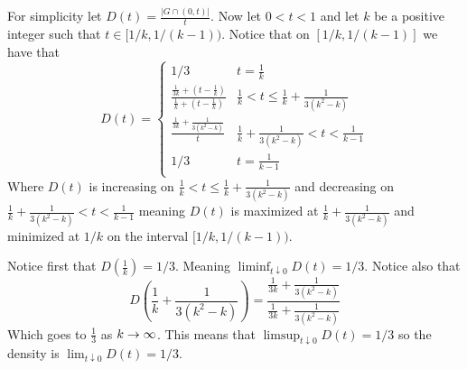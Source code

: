 \documentclass[12pt]{amsart}
\begin{document}
\begin{itemize}
   For simplicity let $D(t)=\frac{|G\cap (0,t)|}{t}$. 
   Now let $0<t<1$ and let $k$ be a positive integer such that $t\in[1/k,1/(k-1))$.
   Notice that on $[1/k,1/(k-1)]$ we have that
   \[D(t)=\begin{cases}
      1/3 & t=\frac{1}{k}\\
      \displaystyle{\frac{\frac{1}{3k}+(t-\frac{1}{k})}{\frac{1}{k}+(t-\frac{1}{k})}} & \frac{1}{k}<t\leq\frac{1}{k}+\frac{1}{3(k^2-k)}\\
      \displaystyle{\frac{\frac{1}{3k}+\frac{1}{3(k^2-k)}}{t}} & \frac{1}{k}+\frac{1}{3(k^2-k)}<t<\frac{1}{{k-1}}\\
      1/3 & t=\frac{1}{{k-1}}\\
   \end{cases}\]
   Where $D(t)$ is increasing on $\frac{1}{k}<t\leq\frac{1}{k}+\frac{1}{3(k^2-k)}$ and 
   decreasing on $\frac{1}{k}+\frac{1}{3(k^2-k)}<t<\frac{1}{{k-1}}$ meaning $D(t)$ is maximized at 
   $\frac{1}{k}+\frac{1}{3(k^2-k)}$ and minimized at $1/k$ on the interval $[1/k,1/({k-1}))$.

   Notice first that $D(\frac{1}{k})=1/3$. Meaning $\liminf_{t\downarrow 0}D(t)=1/3$.
   Notice also that 
   \[D(\frac{1}{k}+\frac{1}{3(k^2-k)})=\frac{\frac{1}{3k}+\frac{1}{3(k^2-k)}}{\frac{1}{3k}+\frac{1}{3(k^2-k)}}\] 
   Which goes to $\frac{1}{3}$ as $k\rightarrow\infty$.
   This means that $\limsup_{t\downarrow 0}D(t)=1/3$
   so the density is $\lim_{t\downarrow 0}D(t)=1/3$.
   
\end{itemize}
\end{document}
